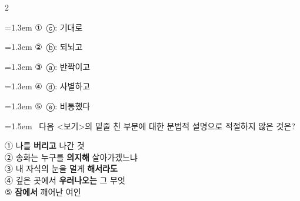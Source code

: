\documentclass[10pt, a4paper]{article}
\begin{document}
\begin{multicols}{2}
\begin{minipage}{\columnwidth}
\vspace{0.5mm}
{\hangindent=1.3em  \noindent\hspace{0.3em}①~ⓒ: 기대로\par}
{\hangindent=1.3em  \noindent\hspace{0.3em}②~ⓑ: 되뇌고\par}
{\hangindent=1.3em  \noindent\hspace{0.3em}③~ⓐ: 반짝이고\par}
{\hangindent=1.3em  \noindent\hspace{0.3em}④~ⓓ: 사별하고\par}
{\hangindent=1.3em  \noindent\hspace{0.3em}⑤~ⓔ: 비통했다\par}
\vspace{4mm}
\end{minipage}
\par

\noindent\begin{minipage}{\columnwidth}
\vspace{2mm}
{\hangindent=1.5em  ~다음 <보기>의 밑줄 친 부분에 대한 문법적 설명으로 적절하지 않은 것은?\par}

\vspace{1mm}
\begin{boxibox}
① 나를 \textbf{버리고} 나간 것 \\
② 송화는 누구를 \textbf{의지해} 살아가겠느냐 \\
③ 내 자식의 눈을 멀게 \textbf{해서라도} \\
④ 깊은 곳에서 \textbf{우러나오는} 그 무엇 \\
⑤ \textbf{잠에서} 깨어난 여인 \\
\end{boxibox}
\vspace{1mm}


\end{minipage}
\end{multicols}
\end{document}
